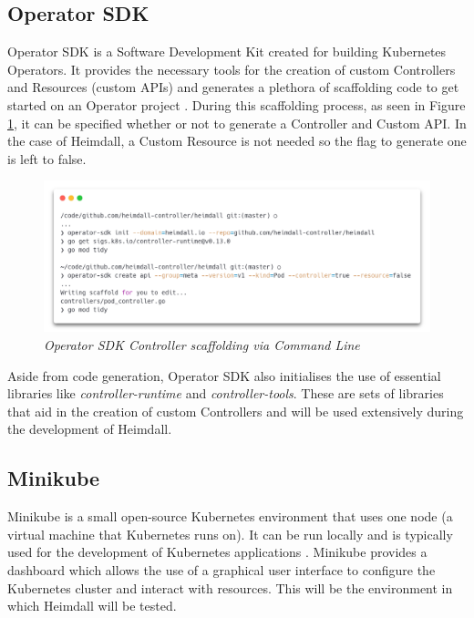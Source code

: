 \documentclass{article}
\begin{document}
\subsection{Operator SDK} \label{osdk}

Operator SDK is a Software Development Kit created for building Kubernetes Operators. It provides the necessary tools for the creation of custom Controllers and Resources (custom APIs) and generates a plethora of scaffolding code to get started on an Operator project \cite{osdk-overview}. During this scaffolding process, as seen in Figure \ref{osdk-img}, it can be specified whether or not to generate a Controller and Custom API. In the case of Heimdall, a Custom Resource is not needed so the flag to generate one is left to false.

\begin{figure}[H]
    \centering
    \includegraphics[width=160mm]{tools/osdk.png}
    \caption{\emph{Operator SDK Controller scaffolding via Command Line}}
    \label{osdk-img}
\end{figure}

Aside from code generation, Operator SDK also initialises the use of essential libraries like \emph{controller-runtime} and \emph{controller-tools}. These are sets of libraries that aid in the creation of custom Controllers and will be used extensively during the development of Heimdall.


\subsection{Minikube}

Minikube is a small open-source Kubernetes environment that uses one node (a virtual machine that Kubernetes runs on). It can be run locally and is typically used for the development of Kubernetes applications \cite{minikube-docs}. Minikube provides a dashboard which allows the use of a graphical user interface to configure the Kubernetes cluster and interact with resources. This will be the environment in which Heimdall will be tested. 
\end{document}
